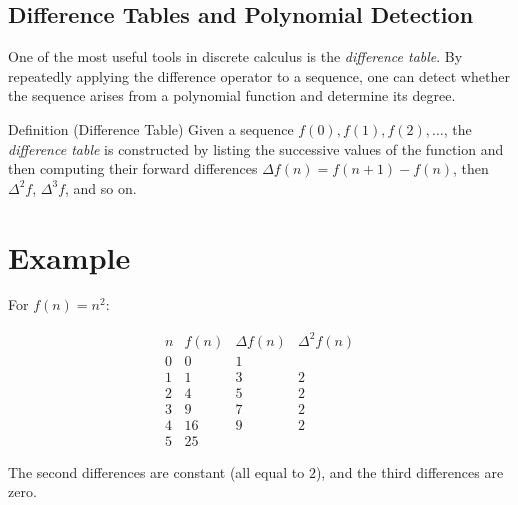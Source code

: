 \subsection{Difference Tables and Polynomial Detection}
\label{subsec:difference-tables}

One of the most useful tools in discrete calculus is the \emph{difference
table}. By repeatedly applying the difference operator to a sequence,
one can detect whether the sequence arises from a polynomial function and
determine its degree.

\begin{definitionbox}{Definition (Difference Table)}
Given a sequence \(f(0), f(1), f(2), \dots\), the \emph{difference table}
is constructed by listing the successive values of the function and then
computing their forward differences \(\Delta f(n) = f(n+1)-f(n)\),
then \(\Delta^2 f\), \(\Delta^3 f\), and so on.
\end{definitionbox}
\label{def:difference-table}

\section*{Example}

For \(f(n) = n^2\):

\[
\begin{array}{c|c|c|c}
n & f(n) & \Delta f(n) & \Delta^2 f(n) \\
\hline
0 & 0  & 1 &   \\
1 & 1  & 3 & 2 \\
2 & 4  & 5 & 2 \\
3 & 9  & 7 & 2 \\
4 & 16 & 9 & 2 \\
5 & 25 &   &
\end{array}
\]

The second differences are constant (all equal to \(2\)), and the third
differences are zero.

